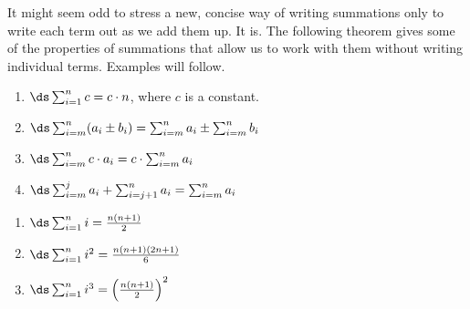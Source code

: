 It might seem odd to stress a new, concise way of writing summations only to write each term out as we add them up. It is. The following theorem gives some of the properties of summations that allow us to work with them without writing individual terms. Examples will follow.

\setboxwidth{75pt}
{\noindent\begin{minipage}[t]{200pt}
\begin{enumerate}
		\item		$\ds \sum_{i=1}^n c = c\cdot n$, where $c$ is a constant.
		\item		$\ds \sum_{i=m}^n (a_i\pm b_i) = \sum_{i=m}^n a_i \pm \sum_{i=m}^n b_i$
		\item		$\ds \sum_{i=m}^n c\cdot a_i = c\cdot\sum_{i=m}^n a_i$
		\item		$\ds \sum_{i=m}^j a_i + \sum_{i=j+1}^n  a_i = \sum_{i=m}^n a_i$
	\end{enumerate}
\end{minipage}
\begin{minipage}[t]{200pt}
\begin{enumerate}\addtocounter{enumi}{4}
		\item		$\ds \sum_{i=1}^n i = \frac{n(n+1)}2$
		\item		$\ds \sum_{i=1}^n i^2 = \frac{n(n+1)(2n+1)}6$
		\item		$\ds \sum_{i=1}^n i^3 = \left(\frac{n(n+1)}2\right)^2$
	\end{enumerate}
\end{minipage}
}
\restoreboxwidth

